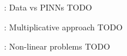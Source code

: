 
\begin{frame}{\appendixname~\theappendixframenumber~: Data vs PINNs}
	TODO
\end{frame}
\addtocounter{appendixframenumber}{1}


\begin{frame}{\appendixname~\theappendixframenumber~: Multiplicative approach}
	TODO
\end{frame}
\addtocounter{appendixframenumber}{1}


\begin{frame}{\appendixname~\theappendixframenumber~: Non-linear problems}
	TODO
\end{frame}
\addtocounter{appendixframenumber}{1}